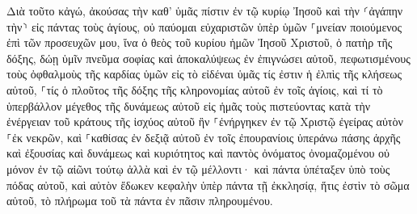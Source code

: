 \documentclass{openreader}
\begin{document}
Διὰ τοῦτο κἀγώ, ἀκούσας τὴν καθ’ ὑμᾶς πίστιν ἐν τῷ κυρίῳ Ἰησοῦ καὶ τὴν ⸂ἀγάπην τὴν⸃ εἰς πάντας τοὺς ἁγίους, 
οὐ παύομαι εὐχαριστῶν ὑπὲρ ὑμῶν ⸀μνείαν ποιούμενος ἐπὶ τῶν προσευχῶν μου, 
ἵνα ὁ θεὸς τοῦ κυρίου ἡμῶν Ἰησοῦ Χριστοῦ, ὁ πατὴρ τῆς δόξης, δώῃ ὑμῖν πνεῦμα σοφίας καὶ ἀποκαλύψεως ἐν ἐπιγνώσει αὐτοῦ, 
πεφωτισμένους τοὺς ὀφθαλμοὺς τῆς καρδίας ὑμῶν εἰς τὸ εἰδέναι ὑμᾶς τίς ἐστιν ἡ ἐλπὶς τῆς κλήσεως αὐτοῦ, ⸀τίς ὁ πλοῦτος τῆς δόξης τῆς κληρονομίας αὐτοῦ ἐν τοῖς ἁγίοις, 
καὶ τί τὸ ὑπερβάλλον μέγεθος τῆς δυνάμεως αὐτοῦ εἰς ἡμᾶς τοὺς πιστεύοντας κατὰ τὴν ἐνέργειαν τοῦ κράτους τῆς ἰσχύος αὐτοῦ 
ἣν ⸀ἐνήργηκεν ἐν τῷ Χριστῷ ἐγείρας αὐτὸν ⸀ἐκ νεκρῶν, καὶ ⸀καθίσας ἐν δεξιᾷ αὐτοῦ ἐν τοῖς ἐπουρανίοις 
ὑπεράνω πάσης ἀρχῆς καὶ ἐξουσίας καὶ δυνάμεως καὶ κυριότητος καὶ παντὸς ὀνόματος ὀνομαζομένου οὐ μόνον ἐν τῷ αἰῶνι τούτῳ ἀλλὰ καὶ ἐν τῷ μέλλοντι· 
καὶ πάντα ὑπέταξεν ὑπὸ τοὺς πόδας αὐτοῦ, καὶ αὐτὸν ἔδωκεν κεφαλὴν ὑπὲρ πάντα τῇ ἐκκλησίᾳ, 
ἥτις ἐστὶν τὸ σῶμα αὐτοῦ, τὸ πλήρωμα τοῦ τὰ πάντα ἐν πᾶσιν πληρουμένου. 
\end{document}
